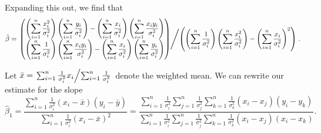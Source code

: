 \documentclass[11pt, letterpaper]{article}
\begin{document}
{\begin{enumerate}[(a)]
\begin{description}
  Expanding this out, we find that
  \begin{equation*}
    \hat{\beta} =
    \left.
      \begin{pmatrix}
        \displaystyle
      \left(\sum_{i=1}^n\frac{x_i^2}{\sigma_i^2}\right)
      \left(\sum_{i=1}^n\frac{y_i}{\sigma_i^2}\right) -
      \left(\sum_{i=1}^n\frac{x_i}{\sigma_i^2}\right)
      \left(\sum_{i=1}^n\frac{x_iy_i}{\sigma_i^2}\right) \\
      \displaystyle
      \left(\sum_{i=1}^n\frac{1}{\sigma_i^2}\right)\left(\sum_{i=1}^n\frac{x_iy_i}{\sigma_i^2}\right) -
      \left(\sum_{i=1}^n\frac{x_i}{\sigma_i^2}\right)
      \left(\sum_{i=1}^n\frac{y_i}{\sigma_i^2}\right)      
    \end{pmatrix}
    \middle/\left(
    \left(\sum_{i=1}^n\frac{1}{\sigma_i^2}\right)
      \left(\sum_{i=1}^n\frac{x_i^2}{\sigma_i^2}\right) -
      \left(\sum_{i=1}^n \frac{x_i}{\sigma_i^2}\right)^2
    \right)
  \right..  
\end{equation*}

Let
$\bar{x} = \left.\sum_{i=1}^n \frac{1}{\sigma_i^2}x_i\middle/\sum_{i=1}^n
  \frac{1}{\sigma_i^2}\right.$ denote the weighted mean. We can rewrite our
estimate for the slope
\begin{equation*}
  \hat{\beta}_1 = \frac{\sum_{i=1}^n\frac{1}{\sigma_i^2}\left(x_i - \bar{x}\right)\left(y_i - \bar{y}\right)}
  {\sum_{i=1}^n\frac{1}{\sigma_i^2}\left(x_i - \bar{x}\right)^2}
  =
  \frac
  {
    \sum_{i=1}^n\frac{1}{\sigma_i^2}\sum_{j=1}^n\frac{1}{\sigma_j^2}\sum_{k=1}^n\frac{1}{\sigma_k^2}
    \left(x_i - x_j\right)\left(y_i - y_k\right)
  }
  {
    \sum_{i=1}^n\frac{1}{\sigma_i^2}\sum_{j=1}^n\frac{1}{\sigma_j^2}\sum_{k=1}^n\frac{1}{\sigma_k^2}
    \left(x_i - x_j\right)\left(x_i - x_k\right)
  }.
\end{equation*}


\end{description}
\end{enumerate}}
\end{document}
